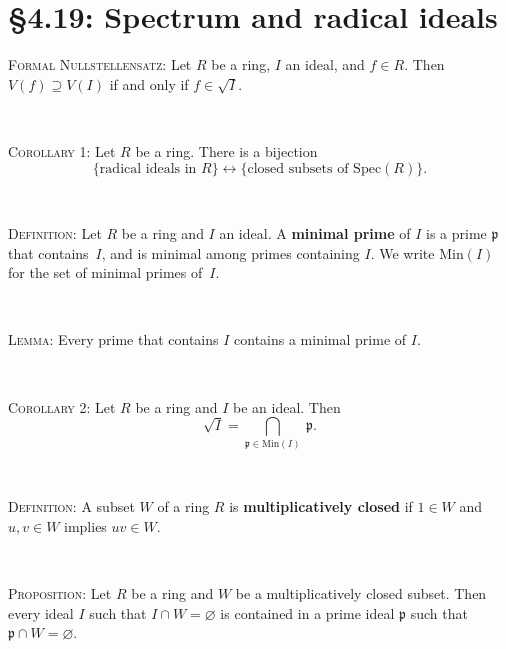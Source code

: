\documentclass[12pt]{amsart}
\newcommand{\p}{\mathfrak{p}}
\newcommand{\1}{\mathbbm{1}}
\newcommand{\showsol}[1]{\def\displaysol{#1}}
\begin{document}
\showsol{0}
	
	\thispagestyle{empty}
	
	\section*{\S4.19: Spectrum and radical ideals}	

\begin{framed}




\noindent \textsc{Formal Nullstellensatz:} Let $R$ be a ring,  $I$ an ideal, and $f\in R$. Then $V(f) \supseteq V(I)$ if and only if $f\in \sqrt{I}$.



\

\noindent \textsc{Corollary 1:} Let $R$ be a ring. There is a bijection
\[ \{ \text{radical ideals in $R$}\}  \longleftrightarrow \{ \text{closed subsets of $\mathrm{Spec}(R)$}\}.\]

\

\noindent \textsc{Definition:} Let $R$ be a ring and $I$ an ideal. A \textbf{minimal prime} of $I$ is a prime $\p$ that contains~$I$, and is minimal among primes containing $I$. We write $\mathrm{Min}(I)$ for the set of minimal primes of~$I$.


\

\noindent \textsc{Lemma:} Every prime that contains $I$ contains a minimal prime of $I$.

\

\noindent \textsc{Corollary 2:} Let $R$ be a ring and $I$ be an ideal. Then
\[ \sqrt{I} = \bigcap_{\p \in \mathrm{Min}(I)} \ \p.\]


\


\noindent \textsc{Definition:} A subset $W$ of a ring $R$ is \textbf{multiplicatively closed} if $1\in W$ and $u,v\in W$ implies $uv\in W$.

\

\noindent \textsc{Proposition:} Let $R$ be a ring and $W$ be a multiplicatively closed subset. Then every ideal $I$ such that $I\cap W = \varnothing$ is contained in a prime ideal $\p$ such that $\p \cap W = \varnothing$.
\end{framed}
\end{document}
